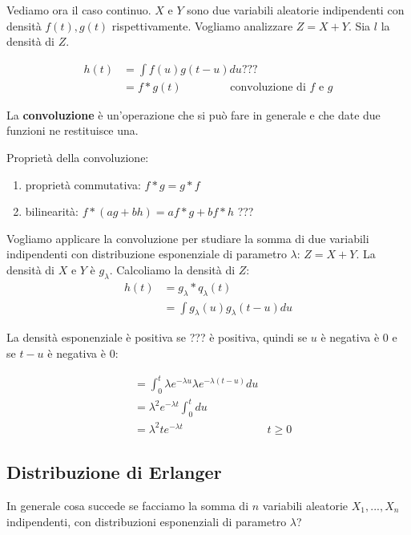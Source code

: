 \documentclass[a4paper,12pt]{book}
\begin{document}
Vediamo ora il caso continuo. $ X $ e $ Y $ sono due variabili aleatorie indipendenti con densità $ f(t), g(t) $ rispettivamente. Vogliamo analizzare $ Z = X + Y$. Sia $ l $ la densità di $ Z $. 

\begin{align*}
	h(t) & = \int f(u) g(t-u) du ??? \\%
	& = f * g(t) \qquad \qquad \text{ convoluzione di } f \text{ e } g
\end{align*}

La \textbf{convoluzione} è un'operazione che si può fare in generale e che date due funzioni ne restituisce una. 

Proprietà della convoluzione: 
\begin{enumerate}
	\item proprietà commutativa: $ f * g = g*f $
	\item bilinearità: $ f * (ag + bh ) = af * g + bf * h $ ??? %
\end{enumerate}

Vogliamo applicare la convoluzione per studiare la somma di due variabili indipendenti con distribuzione esponenziale di parametro $ \lambda $: $ Z = X + Y $. La densità di $ X $ e $ Y $ è $ g_\lambda $. Calcoliamo la densità di $ Z $:
\begin{align*}
	h(t) & = g_\lambda * q_\lambda(t) \\
	& = \int g_\lambda(u) g_\lambda(t-u) du
\end{align*}

La densità esponenziale è positiva se ??? %
è positiva, quindi se $ u $ è negativa è 0 e se $ t-u $ è negativa è 0: %

\begin{align*}
	& = \int_{0}^{t} \lambda e ^{-\lambda u} \lambda e^{-\lambda(t-u)} du \\
	& = \lambda^2 e^{-\lambda t} \int_{0}^{t} du \\
	& = \lambda^2 t e^{-\lambda t} & t \ge 0
\end{align*}

\subsection{Distribuzione di Erlanger} %
In generale cosa succede se facciamo la somma di $ n $ variabili aleatorie $ X_1, ..., X_n $ indipendenti, con distribuzioni esponenziali di parametro $\lambda$? 
\end{document}
